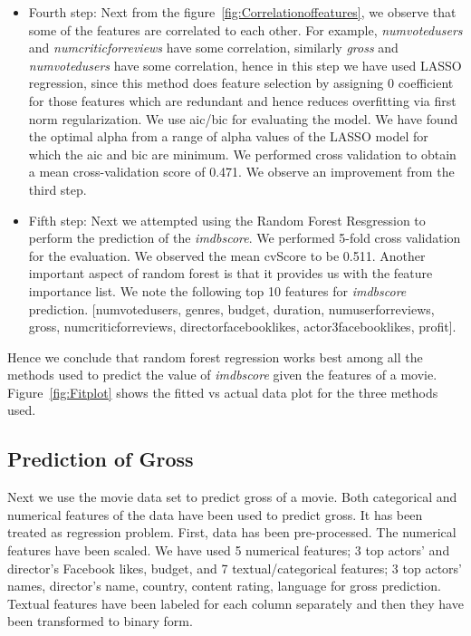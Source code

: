 \documentclass{article}%
\begin{document}
\begin{itemize}
\item Fourth step: Next from the figure~\ref{fig:Correlationoffeatures}, we observe that some of the features are correlated to each other. For example, \textit{numvotedusers} and \textit{numcriticforreviews} have some correlation, similarly \textit{gross} and \textit{numvotedusers} have some correlation, hence in this step we have used LASSO regression, since this method does feature selection by assigning 0 coefficient for those features which are redundant and hence reduces overfitting via first norm regularization. We use aic/bic for evaluating the model. We have found the optimal alpha from a range of alpha values of the LASSO model for which the aic and bic are minimum. We performed cross validation to obtain a mean cross-validation score of 0.471. We observe an improvement from the third step.
\end{itemize}

\begin{itemize}
\item Fifth step: Next we attempted using the Random Forest Resgression to perform the prediction of the \textit{imdbscore}. We performed 5-fold cross validation for the evaluation. We observed the mean cvScore to be 0.511. Another important aspect of random forest is that it provides us with the feature importance list. We note the following top 10 features for \textit{imdbscore} prediction. [numvotedusers, genres, budget, duration, numuserforreviews, gross, numcriticforreviews, directorfacebooklikes, actor3facebooklikes, profit]. 
\end{itemize}

Hence we conclude that random forest regression works best among all the methods used to predict the value of \textit{imdbscore} given the features of a movie. Figure~\ref{fig:Fitplot} shows the fitted vs actual data plot for the three methods used. 

\subsection{Prediction of Gross}
Next we use the movie data set to predict gross of a movie. Both categorical and numerical features of the data have been used to predict gross. It has been treated as regression problem. First, data has been pre-processed. The numerical features have been scaled. We have used 5 numerical features; 3 top actors’ and director’s Facebook likes, budget, and 7 textual/categorical features; 3 top actors’ names, director’s name, country, content rating, language for gross prediction. Textual features have been labeled for each column separately and then they have been transformed to binary form. 
\end{document}
